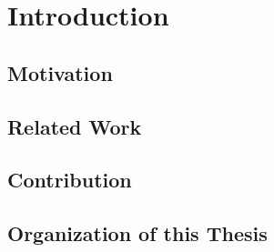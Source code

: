 
\chapter{Introduction}  \label{sec:introduction}

\section{Motivation}  \label{sec:motivation}

\section{Related Work}  \label{sec:rel-work}

\section{Contribution}  \label{sec:contribution}

\section{Organization of this Thesis}  \label{sec:orga}
